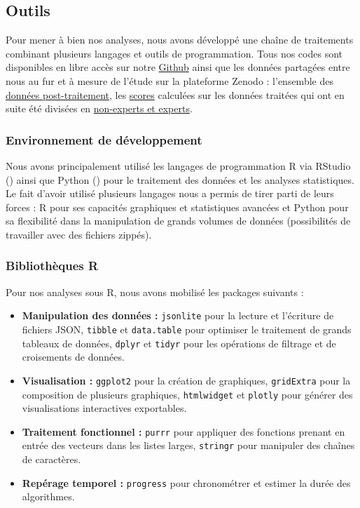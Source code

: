 \documentclass[a4paper,12pt]{article}
\begin{document}

\subsection{Outils}

Pour mener à bien nos analyses, nous avons développé une chaîne de traitements combinant plusieurs langages et outils de programmation. Tous nos codes sont disponibles en libre accès sur notre \href{https://github.com/lcletz/PLANTNET_M1_SSD}{Github} ainsi que les données partagées entre nous au fur et à mesure de l'étude sur la plateforme Zenodo : l'ensemble des \href{https://zenodo.org/records/15355864}{données post-traitement}, les \href{https://zenodo.org/records/15464436}{scores} calculées sur les données traitées qui ont en suite été divisées en \href{https://zenodo.org/records/15441507}{non-experts et experts}.

\subsubsection{Environnement de développement}

Nous avons principalement utilisé les langages de programmation R via RStudio (\cite{RStudio}) ainsi que Python (\cite{Python}) pour le traitement des données et les analyses statistiques. Le fait d'avoir utilisé plusieurs langages nous a permis de tirer parti de leurs forces : R pour ses capacités graphiques et statistiques avancées et Python pour sa flexibilité dans la manipulation de grands volumes de données (possibilités de travailler avec des fichiers zippés).

\subsubsection{Bibliothèques R}

Pour nos analyses sous R, nous avons mobilisé les packages suivants :
\begin{itemize}
    \item \textbf{Manipulation des données :} \texttt{jsonlite} pour la lecture et l'écriture de fichiers JSON, \texttt{tibble} et \texttt{data.table} pour optimiser le traitement de grands tableaux de données, \texttt{dplyr} et \texttt{tidyr} pour les opérations de filtrage et de croisements de données.
    \item \textbf{Visualisation :} \texttt{ggplot2} pour la création de graphiques, \texttt{gridExtra} pour la composition de plusieurs graphiques, \texttt{htmlwidget} et \texttt{plotly} pour générer des visualisations interactives exportables.
    \item \textbf{Traitement fonctionnel :} \texttt{purrr} pour appliquer des fonctions prenant en entrée des vecteurs dans les listes larges, \texttt{stringr} pour manipuler des chaînes de caractères.
    \item \textbf{Repérage temporel :} \texttt{progress} pour chronométrer et estimer la durée des algorithmes.
\end{itemize}
\end{document}
